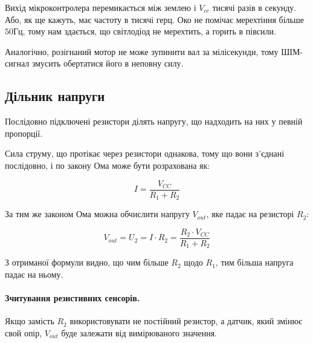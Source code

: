 \documentclass[12pt,a4paper]{book}  %
\begin{document}
Вихід мікроконтролера перемикається між землею і $V_{cc}$ тисячі разів в секунду. Або, як ще кажуть, має частоту в тисячі герц. Око не помічає мерехтіння більше $50 \text{Гц}$, тому нам здається, що світлодіод не мерехтить, а горить в півсили.

Аналогічно, розігнаний мотор не може зупинити вал за мілісекунди, тому ШІМ-сигнал змусить обертатися його в неповну силу.

\subsection{Дільник напруги}

Послідовно підключені резистори ділять напругу, що надходить на них у певній пропорції.

Сила струму, що протікає через резистори однакова, тому що вони з'єднані послідовно, і по закону Ома може бути розрахована як:

$$ I = \dfrac{V_{CC}}{R_1 + R_2} $$

За тим же законом Ома можна обчислити напругу $V_{out}$, яке падає на резисторі $R_2$:

$$ V_{out} = U_2 = I \cdot R_2 = \frac {R_2 \cdot V_{CC}}{R_1 + R_2} $$

З отриманої формули видно, що чим більше $R_2$ щодо $R_1$, тим більша напруга падає на ньому.

\paragraph{Зчитування резистивних сенсорів.}

Якщо замість $R_2$ використовувати не постійний резистор, а датчик, який змінює свой опір, $V_{out}$ буде залежати від вимірюваного значення.

\begin{figure}[h!]
\label{ris:image}
\end{figure}
\end{document}
